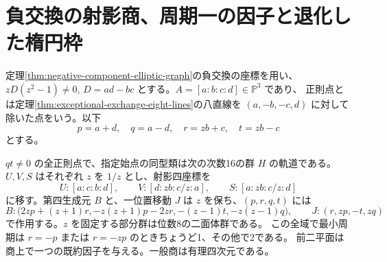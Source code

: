 \section{負交換の射影商、周期一の因子と退化した楕円枠}
\label{sec:negative-pairing-unmarked-quotient}
定理\ref{thm:negative-component-elliptic-graph}の負交換の座標を用い、
$zD(z^2-1)\ne0$, $D=ad-bc$ とする。$A=[a:b:c:d]\in\mathbb P^3$ であり、
正則点とは定理\ref{thm:exceptional-exchange-eight-lines}の八直線を
$(a,-b,-c,d)$ に対して除いた点をいう。以下
\[
 p=a+d,\quad q=a-d,\quad r=zb+c,\quad t=zb-c
\]
とする。
\begin{theorem}\label{thm:negative-pairing-unmarked-quotient}
$qt\ne0$ の全正則点で、指定始点の同型類は次の次数16の群 $H$ の軌道である。
$U,V,S$ はそれぞれ $z$ を $1/z$ とし、射影四座標を
\[
 U:[a:c:b:d],\qquad V:[d:zb:c/z:a],\qquad S:[a:zb:c/z:d]
\]
に移す。第四生成元 $B$ と、一位置移動 $J$ は $z$ を保ち、$(p,r,q,t)$ には
\[
 B:\big(2zp+(z+1)r,-z(z+1)p-2zr,-(z-1)t,-z(z-1)q\big),
 \qquad J:(r,zp,-t,zq)
\]
で作用する。$z$ を固定する部分群は位数8の二面体群である。
この全域で最小周期は $r=-p$ または $r=-zp$ のときちょうど1、その他で2である。
前二平面は商上で一つの既約因子を与える。一般商は有理四次元である。
\end{theorem}

